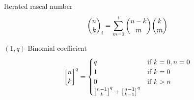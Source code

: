 ﻿\begin{definition}
    Iterated rascal number
    \begin{align}
        \binom{n}{k}_{i} = \sum_{m=0}^{i} \binom{n-k}{m} \binom{k}{m}
    \end{align}
\end{definition}

\begin{definition}
    $(1,q)$-Binomial coefficient
    \begin{equation}
        \oneQBinomial{n}{k}{q} =
        \begin{cases}
            q & \mathrm{if} \; k=0, n=0 \\
            1 & \mathrm{if} \; k=0 \\
            0 & \mathrm{if} \; k > n \\
            \oneQBinomial{n-1}{k}{q} + \oneQBinomial{n-1}{k-1}{q}
        \end{cases}\label{eq:qbinomial-definition}
    \end{equation}
\end{definition}
